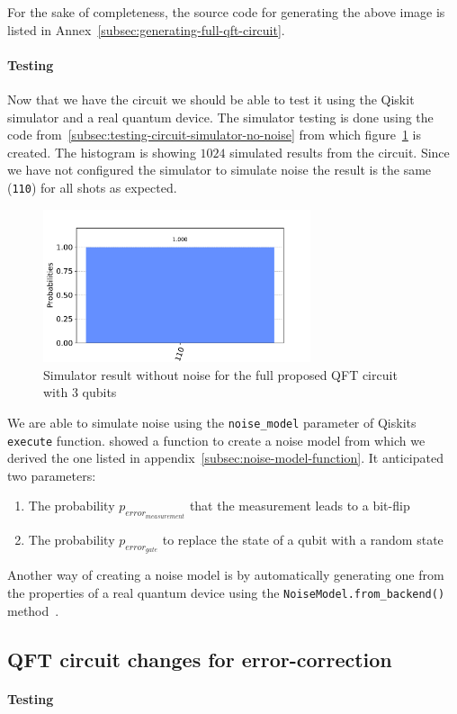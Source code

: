 For the sake of completeness, the source code for generating the above image is listed in Annex~\ref{subsec:generating-full-qft-circuit}.

\paragraph{Testing}

Now that we have the circuit we should be able to test it using the Qiskit simulator and a real quantum device.
The simulator testing is done using the code from~\ref{subsec:testing-circuit-simulator-no-noise} from which figure~\ref{fig:test-histogram} is created.
The histogram is showing \(1024\) simulated results from the circuit.
Since we have not configured the simulator to simulate noise the result is the same (\texttt{110}) for all shots as expected.

\begin{figure}[H]
    \centering
    \includegraphics[width=0.7\textwidth]{res/test-histogram.pdf}
    \caption{Simulator result without noise for the full proposed QFT circuit with 3 qubits}
    \label{fig:test-histogram}
\end{figure}

We are able to simulate noise using the \texttt{noise\_model} parameter of Qiskits \texttt{execute} function.
 showed a function to create a noise model from which we derived the one listed in appendix~\ref{subsec:noise-model-function}.
It anticipated two parameters:
\begin{enumerate}
    \item The probability \(p_{error_{measurement}}\) that the measurement leads to a bit-flip
    \item The probability \(p_{error_{gate}}\) to replace the state of a qubit with a random state
\end{enumerate}

Another way of creating a noise model is by automatically generating one from the properties of a real quantum device using the \texttt{NoiseModel.from\_backend()} method~\cite{QiskitDocsNoise}.

\subsection{QFT circuit changes for error-correction}
\label{subsec:qft-circuit-error-correction}

\paragraph{Testing}
